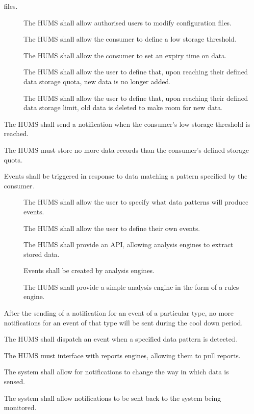 \begin{description}
			files.
	 \begin{description}
	  	\item[] The HUMS shall allow authorised users to modify
 		configuration files. 
		 \item[] The HUMS shall allow the consumer to define a 	
			low storage threshold.
		  \item[] The HUMS shall allow the consumer to set an 
			expiry time on data.
		  \item[] The HUMS shall allow the user to define that, 
			upon reaching their defined data storage quota, new data is 
			no longer added.
		 \item[] The HUMS shall allow the user to define that, 
			upon reaching their defined data storage limit, old data is 
			deleted to make room for new data.
	\end{description}
	 \item[\fr{5}] The HUMS shall send a notification when the consumer's 
		low storage threshold is reached.
	  \item[\fr{6}] The HUMS must store no more data records than the 	
		consumer's defined storage quota.
	\item[\fr{7}]Events shall be triggered in response to data matching a pattern 
	specified by the consumer.
		  \begin{description}
			 \item[]  The HUMS shall allow the user to specify 	
			what data patterns will produce events.
			 \item[] The HUMS shall allow the user to define their
 			own events.
 			\item[] The HUMS shall provide an API, 			
			allowing analysis engines to extract stored data.
			\item[] Events shall be created by analysis engines.
 			\item[] The HUMS shall provide a simple analysis 	
			engine in the form of a rules engine.
	\end{description}
	
	\item[\fr{8}]After the sending of a notification for an event of a particular 
		type, no more notifications for an event of that type will be 	
		sent during the cool down period.
	\item[\fr{9}]The HUMS shall dispatch an event when a specified data 
		pattern is detected.
	\item[\fr{10}] The HUMS must interface with reports engines, allowing 
		them to pull reports.
	\item[\fr{11}] The system shall allow for notifications to change the way 
		in which data is sensed.
	 \item[\fr{12}] The system shall allow notifications to be sent back to 
		the system being monitored.
\end{description}

